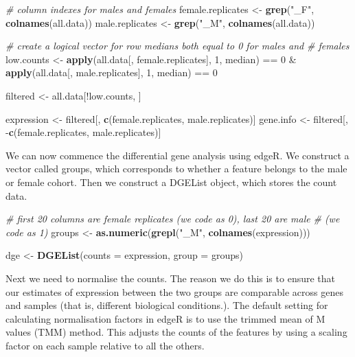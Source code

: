 \documentclass[]{article}
\newenvironment{Shaded}{\begin{snugshade}}{\end{snugshade}}
\newcommand{\KeywordTok}[1]{\textcolor[rgb]{0.13,0.29,0.53}{\textbf{{#1}}}}
\newcommand{\DataTypeTok}[1]{\textcolor[rgb]{0.13,0.29,0.53}{{#1}}}
\newcommand{\DecValTok}[1]{\textcolor[rgb]{0.00,0.00,0.81}{{#1}}}
\newcommand{\StringTok}[1]{\textcolor[rgb]{0.31,0.60,0.02}{{#1}}}
\newcommand{\CommentTok}[1]{\textcolor[rgb]{0.56,0.35,0.01}{\textit{{#1}}}}
\newcommand{\NormalTok}[1]{{#1}}
\begin{document}
\begin{Shaded}
\begin{Highlighting}[]
\CommentTok{# column indexes for males and females}
\NormalTok{female.replicates <-}\StringTok{ }\KeywordTok{grep}\NormalTok{(}\StringTok{"_F"}\NormalTok{, }\KeywordTok{colnames}\NormalTok{(all.data))}
\NormalTok{male.replicates <-}\StringTok{ }\KeywordTok{grep}\NormalTok{(}\StringTok{"_M"}\NormalTok{, }\KeywordTok{colnames}\NormalTok{(all.data))}

\CommentTok{# create a logical vector for row medians both equal to 0 for males and}
\CommentTok{# females}
\NormalTok{low.counts <-}\StringTok{ }\KeywordTok{apply}\NormalTok{(all.data[, female.replicates], }\DecValTok{1}\NormalTok{, median) ==}\StringTok{ }\DecValTok{0} \NormalTok{&}\StringTok{ }\KeywordTok{apply}\NormalTok{(all.data[, }
    \NormalTok{male.replicates], }\DecValTok{1}\NormalTok{, median) ==}\StringTok{ }\DecValTok{0}

\NormalTok{filtered <-}\StringTok{ }\NormalTok{all.data[!low.counts, ]}

\NormalTok{expression <-}\StringTok{ }\NormalTok{filtered[, }\KeywordTok{c}\NormalTok{(female.replicates, male.replicates)]}
\NormalTok{gene.info <-}\StringTok{ }\NormalTok{filtered[, -}\KeywordTok{c}\NormalTok{(female.replicates, male.replicates)]}
\end{Highlighting}
\end{Shaded}

We can now commence the differential gene analysis using edgeR. We
construct a vector called groups, which corresponds to whether a feature
belongs to the male or female cohort. Then we construct a DGEList
object, which stores the count data.

\begin{Shaded}
\begin{Highlighting}[]
\CommentTok{# first 20 columns are female replicates (we code as 0), last 20 are male}
\CommentTok{# (we code as 1)}
\NormalTok{groups <-}\StringTok{ }\KeywordTok{as.numeric}\NormalTok{(}\KeywordTok{grepl}\NormalTok{(}\StringTok{"_M"}\NormalTok{, }\KeywordTok{colnames}\NormalTok{(expression)))}

\NormalTok{dge <-}\StringTok{ }\KeywordTok{DGEList}\NormalTok{(}\DataTypeTok{counts =} \NormalTok{expression, }\DataTypeTok{group =} \NormalTok{groups)}
\end{Highlighting}
\end{Shaded}

Next we need to normalise the counts. The reason we do this is to ensure
that our estimates of expression between the two groups are comparable
across genes and samples (that is, different biological conditions.).
The default setting for calculating normalisation factors in edgeR is to
use the trimmed mean of M values (TMM) method. This adjusts the counts
of the features by using a scaling factor on each sample relative to all
the others.
\end{document}
